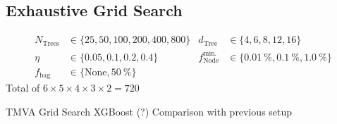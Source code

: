 \subsection{Exhaustive Grid Search}
\label{sec:bdt_grid_search}

\begin{align*}
  N_\mathrm{Trees} &\in \{25, 50, 100, 200, 400, 800\} &
  d_\mathrm{Tree} &\in \{4, 6, 8, 12, 16\} \\
  \eta &\in \{0.05, 0.1, 0.2, 0.4\} &
                                      f_\mathrm{Node}^\mathrm{min.} &\in \{\SI{0.01}{\percent}, \SI{0.1}{\percent},\SI{1.0}{\percent}\} \\
  f_\text{bag} &\in \{\text{None}, \SI{50}{\percent} \}
\end{align*}
Total of $6 \times 5 \times 4 \times 3 \times 2 = 720$

TMVA Grid Search
XGBoost (?)
Comparison with previous setup


